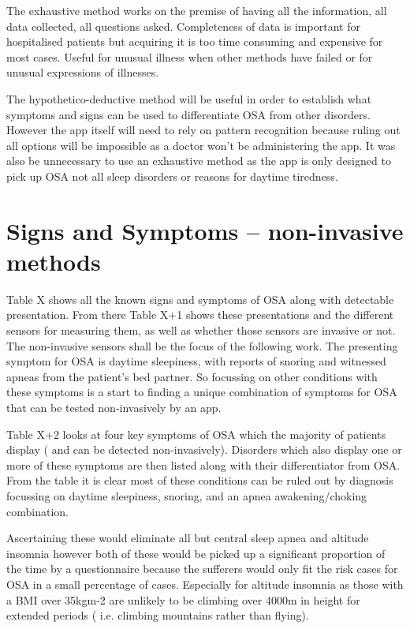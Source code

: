 The exhaustive method works on the premise of having all the information, all data collected, all questions asked. Completeness of data is important for hospitalised patients but acquiring it is too time consuming and expensive for most cases. Useful for unusual illness when other methods have failed or for unusual expressions of illnesses. 

The hypothetico-deductive method will be useful in order to establish what symptoms and signs can be used to differentiate OSA from other disorders. However the app itself will need to rely on pattern recognition because ruling out all options will be impossible as a doctor won’t be administering the app. It was also be unnecessary to use an exhaustive method as the app is only designed to pick up OSA not all sleep disorders or reasons for daytime tiredness. 

\section{Signs and Symptoms -- non-invasive methods}
Table X shows all the known signs and symptoms of OSA along with detectable presentation. From there Table X+1 shows these presentations and the different sensors for measuring them, as well as whether those sensors are invasive or not. The non-invasive sensors shall be the focus of the following work. The presenting symptom for OSA is daytime sleepiness, with reports of snoring and witnessed apneas from the patient’s bed partner. So focussing on other conditions with these symptoms is a start to finding a unique combination of symptoms for OSA that can be tested non-invasively by an app. 


Table X+2 looks at four key symptoms of OSA which the majority of patients display ( and can be detected non-invasively). Disorders which also display one or more of these symptoms are then listed along with their differentiator from OSA. From the table it is clear most of these conditions can be ruled out by diagnosis focussing on daytime sleepiness, snoring, and an apnea awakening/choking combination. 

Ascertaining these would eliminate all but central sleep apnea and altitude insomnia however both of these would be picked up a significant proportion of the time by a questionnaire because the sufferers would only fit the risk cases for OSA in a small percentage of cases. Especially for altitude insomnia as those with a BMI over 35kgm-2 are unlikely to be climbing over 4000m in height for extended periods ( i.e. climbing mountains rather than flying).

